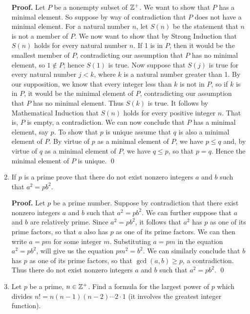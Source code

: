 \begin{enumerate}
      \textbf{Proof.} Let $P$ be a nonempty subset of $\mathbb{Z}^+$. We want to show 
      that $P$ has a minimal element. So suppose by way of contradiction that
      $P$ does not have a minimal element. For a natural number $n$, let $S(n)$ 
      be the statement that $n$ is not a member of $P$. We now want to show that
      by Strong Induction that $S(n)$ holds for every natural number $n$. If 1
      is in $P$, then it would be the smallest member of $P$, contradicting our
      assumption that $P$ has no minimal element, so $1 \notin P$; hence $S(1)$ 
      is true. Now suppose that $S(j)$ is true for every natural number $j < k$,
      where $k$ is a natural number greater than 1. By our supposition, we know
      that every integer less than $k$ is not in $P$, so if $k$ is in $P$, it
      would be the minimal element of $P$, contradicting our assumption that $P$
      has no minimal element. Thus $S(k)$ is true. It follows by Mathematical
      Induction that $S(n)$ holds for every positive integer $n$. That is, $P$
      is empty, a contradiction. We can now conclude that $P$ has a minimal 
      element, say $p$. To show that $p$ is unique assume that $q$ is also a
      minimal element of $P$. By virtue of $p$ as a minimal element of $P$, we 
      have $p \le q$ and, by virtue of $q$ as a minimal element of $P$, we have
      $q \le p$, so that $p = q$. Hence the minimal element of $P$ is
      unique. \qed
   \item[0.2.7]   If $p$ is a prime prove that there do not exist nonzero
                  integers $a$ and $b$ such that $a^2 = pb^2$.

      \textbf{Proof.} Let $p$ be a prime number. Suppose by contradiction that 
      there exist nonzero integers $a$ and $b$ such that $a^2 = pb^2$. We can
      further suppose that $a$ and $b$ are relatively prime. Since $a^2 = pb^2$,
      it follows that $a^2$ has $p$ as one of its prime factors, so that $a$
      also has $p$ as one of its prime factors. We can then write $a = pm$
      for some integer $m$. Substituting $a = pm$ in the equation $a^2 = pb^2$,
      will give us the equation $pm^2 = b^2$. We can similarly conclude that
      $b$ has $p$ as one of its prime factors, so that $\gcd(a, b) \ge p$, a
      contradiction. Thus there do not exist nonzero integers $a$ and $b$ such 
      that $a^2 = pb^2$. \qed
   \item[0.2.8]   Let $p$ be a prime, $n \in \mathbb{Z}^+$. Find a formula for the
                  largest power of $p$ which divides
                  $n! = n(n - 1)(n - 2)\cdots2 \cdot 1$ (it involves the
                  greatest integer function).


\end{enumerate}
